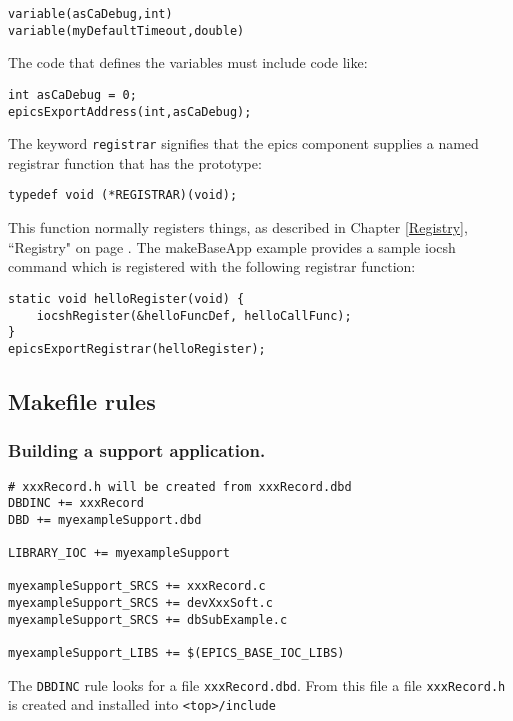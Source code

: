 \begin{verbatim}
variable(asCaDebug,int)
variable(myDefaultTimeout,double)
\end{verbatim}

The code that defines the variables must include code like:

\begin{verbatim}
int asCaDebug = 0;
epicsExportAddress(int,asCaDebug);
\end{verbatim}

The keyword \verb|registrar| signifies that the epics component supplies a named registrar function that has the prototype:

\begin{verbatim}
typedef void (*REGISTRAR)(void);
\end{verbatim}

This function normally registers things, as described in Chapter \ref{Registry}, ``Registry" on page \pageref{Registry}. The makeBaseApp example
provides a sample iocsh command which is registered with the following registrar function:

\begin{verbatim}
static void helloRegister(void) {
    iocshRegister(&helloFuncDef, helloCallFunc);
}
epicsExportRegistrar(helloRegister);
\end{verbatim}

\subsection{Makefile rules}

\subsubsection{Building a support application.}

\begin{verbatim}
# xxxRecord.h will be created from xxxRecord.dbd
DBDINC += xxxRecord
DBD += myexampleSupport.dbd

LIBRARY_IOC += myexampleSupport

myexampleSupport_SRCS += xxxRecord.c
myexampleSupport_SRCS += devXxxSoft.c
myexampleSupport_SRCS += dbSubExample.c

myexampleSupport_LIBS += $(EPICS_BASE_IOC_LIBS)
\end{verbatim}

The \verb|DBDINC| rule looks for a file \verb|xxxRecord.dbd|. From this file a file \verb|xxxRecord.h| is created and installed into \verb|<top>/include|

